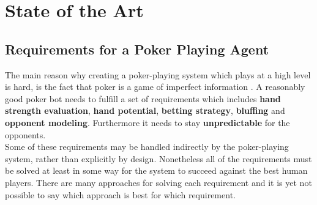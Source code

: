 
\tableofcontents






\newpage

\chapter{State of the Art}

\section{Requirements for a Poker Playing Agent}
The main reason why creating a poker-playing system which plays at a high level is hard, is the fact that poker is a game of imperfect information \cite{nn_impl}.
A reasonably good poker bot needs to fulfill a set of requirements which includes \textbf{hand strength evaluation}, \textbf{hand potential}, \textbf{betting strategy}, \textbf{bluffing} and \textbf{opponent modeling}. Furthermore it needs to stay \textbf{unpredictable} for the opponents.\cite{key_components}\\
Some of these requirements may be handled indirectly by the poker-playing system, rather than explicitly by design. Nonetheless all of the requirements must be solved at least in some way for the system to succeed against the best human players. There are many approaches for solving each requirement and it is yet not possible to say which approach is best for which requirement. \cite{phd_poker}
